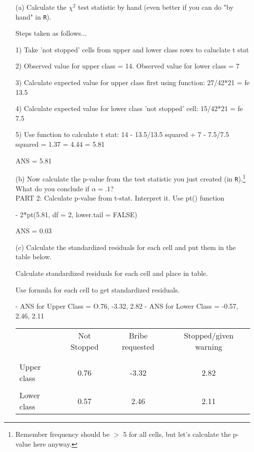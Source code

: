 \documentclass[12pt,letterpaper]{article}
\begin{document}
\begin{enumerate}
	
	\item [(a)]
	Calculate the $\chi^2$ test statistic by hand (even better if you can do "by hand" in \texttt{R}).\\
	\vspace{1cm}
	
	Steps taken as follows...
	
	1) Take 'not stopped' cells from upper and lower class rows to caluclate t stat
	
	2) Observed value for upper class = 14. Observed value for lower class = 7

 3) Calculate expected value for upper class first using function: 27/42*21 = fe 13.5

4) Calculate expected value for lower class 'not stopped' cell:  
15/42*21 = fe 7.5

5) Use function to calculate t stat: 14 - 13.5/13.5 squared + 7 - 7.5/7.5 squared = 1.37 = 4.44 = 5.81

ANS = 5.81
	
	
	
	\item [(b)]
	Now calculate the p-value from the test statistic you just created (in \texttt{R}).\footnote{Remember frequency should be $>$ 5 for all cells, but let's calculate the p-value here anyway.}  What do you conclude if $\alpha = .1$?\\

PART 2: Calculate p-value from t-stat. Interpret it. Use pt() function

- 2*pt(5.81, df = 2, lower.tail = FALSE)

 ANS = 0.03


	\newpage
	\item [(c)] Calculate the standardized residuals for each cell and put them in the table below.
	\vspace{1cm}
	
	Calculate standardized residuals for each cell and place in table.
	
	Use formula for each cell to get standardized residuals.
	
	- ANS for Upper Class = O.76, -3.32, 2.82
	- ANS for Lower Class = -0.57, 2.46, 2.11
	
	\begin{table}[h]
		\centering
		\begin{tabular}{l | c c c }
			& Not Stopped & Bribe requested & Stopped/given warning \\
			\\[-1.8ex] 
			\hline \\[-1.8ex]
			Upper class  & 0.76 & -3.32 & 2.82 \\
			\\
			Lower class & 0.57 & 2.46  & 2.11  \\
			

\end{tabular}
\end{table}
\end{enumerate}
\end{document}
